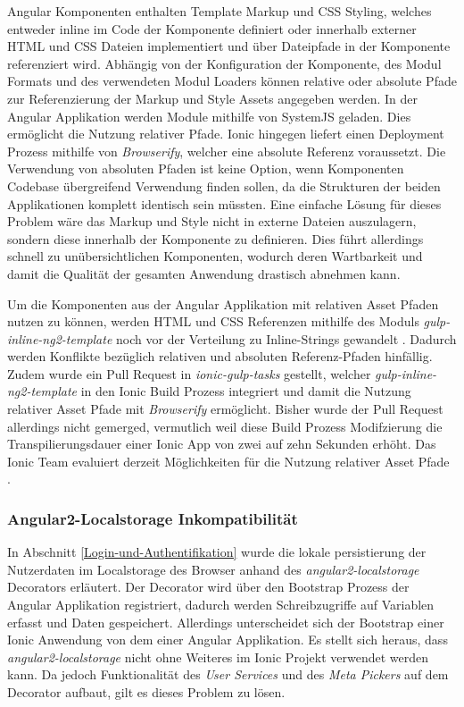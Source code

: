 Angular Komponenten enthalten Template Markup und \ac{CSS} Styling, welches entweder inline im Code der Komponente
definiert oder innerhalb externer \ac{HTML} und \ac{CSS} Dateien implementiert und über Dateipfade in der Komponente referenziert wird.
Abhängig von der Konfiguration der Komponente, des Modul Formats und des verwendeten Modul Loaders
können relative oder absolute Pfade zur Referenzierung der Markup und Style Assets angegeben werden.
In der Angular Applikation werden Module mithilfe von SystemJS geladen. Dies ermöglicht die Nutzung relativer Pfade.
Ionic hingegen liefert einen Deployment Prozess mithilfe von \emph{Browserify}, welcher eine absolute Referenz voraussetzt.
Die Verwendung von absoluten Pfaden ist keine Option, wenn Komponenten Codebase übergreifend Verwendung finden sollen,
da die Strukturen der beiden Applikationen komplett identisch sein müssten.
Eine einfache Lösung für dieses Problem wäre das Markup und Style nicht in externe Dateien auszulagern,
sondern diese innerhalb der Komponente zu definieren.
Dies führt allerdings schnell zu unübersichtlichen Komponenten,
wodurch deren Wartbarkeit und damit die Qualität der gesamten Anwendung drastisch abnehmen kann.

Um die Komponenten aus der Angular Applikation mit relativen Asset Pfaden nutzen zu können,
werden \ac{HTML} und \ac{CSS} Referenzen mithilfe des Moduls \emph{gulp-inline-ng2-template} noch vor der Verteilung zu Inline-Strings gewandelt \cite{ludoh30:online}.
Dadurch werden Konflikte bezüglich relativen und absoluten Referenz-Pfaden hinfällig.
Zudem wurde ein Pull Request in \emph{ionic-gulp-tasks} gestellt, welcher \emph{gulp-inline-ng2-template}
in den Ionic Build Prozess integriert und damit die Nutzung relativer Asset Pfade mit \emph{Browserify} ermöglicht.
Bisher wurde der Pull Request allerdings nicht gemerged, vermutlich weil diese Build Prozess Modifzierung die
Transpilierungsdauer einer Ionic App von zwei auf zehn Sekunden erhöht.
Das Ionic Team evaluiert derzeit Möglichkeiten für die Nutzung relativer Asset Pfade \cite{relat31:online}.

\subsubsection{Angular2-Localstorage Inkompatibilität}
In Abschnitt \ref{Login-und-Authentifikation} wurde die lokale persistierung der Nutzerdaten im Localstorage
des Browser anhand des \emph{angular2-localstorage} Decorators erläutert.
Der Decorator wird über den Bootstrap Prozess der Angular Applikation registriert,
dadurch werden Schreibzugriffe auf Variablen erfasst und Daten gespeichert.
Allerdings unterscheidet sich der Bootstrap einer Ionic Anwendung von dem einer Angular Applikation.
Es stellt sich heraus, dass \emph{angular2-localstorage} nicht ohne Weiteres im Ionic Projekt verwendet werden kann.
Da jedoch Funktionalität des \emph{User Services} und des \emph{Meta Pickers} auf dem Decorator aufbaut,
gilt es dieses Problem zu lösen.

